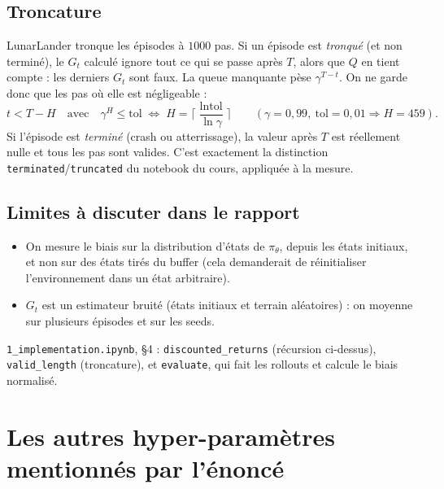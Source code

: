 \documentclass[11pt,a4paper]{article}
\newcommand{\code}[1]{\texttt{#1}}
\begin{document}
\subsection{Troncature}
LunarLander tronque les épisodes à $1000$ pas. Si un épisode est \emph{tronqué} (et non terminé), le
$G_t$ calculé ignore tout ce qui se passe après $T$, alors que $Q$ en tient compte : les derniers
$G_t$ sont faux. La queue manquante pèse $\gamma^{T-t}$. On ne garde donc que les pas où elle est
négligeable :
\begin{equation}
  t < T - H \quad\text{avec}\quad \gamma^H \le \text{tol}
  \;\Longleftrightarrow\; H = \Big\lceil \frac{\ln \text{tol}}{\ln\gamma}\Big\rceil
  \qquad (\gamma=0{,}99,\ \text{tol}=0{,}01 \Rightarrow H = 459).
\end{equation}
Si l'épisode est \emph{terminé} (crash ou atterrissage), la valeur après $T$ est réellement nulle et
tous les pas sont valides. C'est exactement la distinction \code{terminated}/\code{truncated} du
notebook du cours, appliquée à la mesure.

\subsection{Limites à discuter dans le rapport}
\begin{itemize}
  \item On mesure le biais sur la distribution d'états de $\pi_\theta$, depuis les états initiaux,
    et non sur des états tirés du buffer (cela demanderait de réinitialiser l'environnement dans un
    état arbitraire).
  \item $G_t$ est un estimateur bruité (états initiaux et terrain aléatoires) : on moyenne sur
    plusieurs épisodes et sur les seeds.
\end{itemize}

\begin{codebox}
\code{1\_implementation.ipynb}, §4 : \code{discounted\_returns} (récursion ci-dessus),
\code{valid\_length} (troncature), et \code{evaluate}, qui fait les rollouts et calcule le biais
normalisé.
\end{codebox}

\section{Les autres hyper-paramètres mentionnés par l'énoncé}
\end{document}
